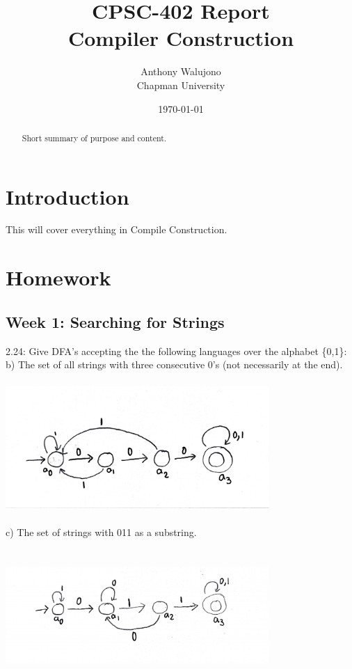 \documentclass{article}
\title{CPSC-402 Report\\Compiler Construction}
\author{Anthony Walujono \\ Chapman University}
\date{\today}
\theoremstyle{theorem}
\theoremstyle{definition}
\theoremstyle{remark}
\begin{document}
\maketitle

\begin{abstract}
Short  summary of purpose and content.  
\end{abstract}

\tableofcontents

\section{Introduction}\label{intro}

This will cover everything in Compile Construction.

\section{Homework}\label{homework}
\subsection{Week 1: Searching for Strings}
2.24: Give DFA's accepting the the following languages over the alphabet \{0,1\}:
\newline \indent b) The set of all strings with three consecutive 0's (not necessarily at the end).
\medskip\begin{center}
\includegraphics[width=10cm, height=5cm]{Week1b.pdf}
\end{center}
\indent c) The set of strings with 011 as a substring.
\medskip\begin{center}
\includegraphics[width=10cm, height=5cm]{Week1c.pdf}
\end{center}
\end{document}
